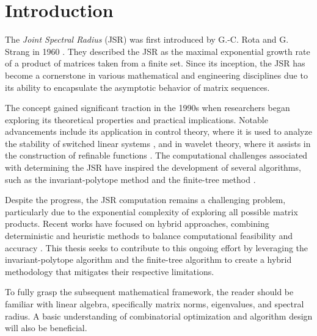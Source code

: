 
\chapter{Introduction}
\label{ch:introduction} %

The \textit{Joint Spectral Radius} (JSR) was first introduced by G.-C. Rota and G. Strang in 1960 \citep{rota1960note}. They described the JSR as the maximal exponential growth rate of a product of matrices taken from a finite set. Since its inception, the JSR has become a cornerstone in various mathematical and engineering disciplines due to its ability to encapsulate the asymptotic behavior of matrix sequences. 

The concept gained significant traction in the 1990s when researchers began exploring its theoretical properties and practical implications. Notable advancements include its application in control theory, where it is used to analyze the stability of switched linear systems \citep{blondel2000survey}, and in wavelet theory, where it assists in the construction of refinable functions \citep{daubechies1992ten}. The computational challenges associated with determining the JSR have inspired the development of several algorithms, such as the invariant-polytope method \citep{protasov2013invariant} and the finite-tree method \citep{jungers2009joint}.

Despite the progress, the JSR computation remains a challenging problem, particularly due to the exponential complexity of exploring all possible matrix products. Recent works have focused on hybrid approaches, combining deterministic and heuristic methods to balance computational feasibility and accuracy \citep{king2022hybrid}. This thesis seeks to contribute to this ongoing effort by leveraging the invariant-polytope algorithm and the finite-tree algorithm to create a hybrid methodology that mitigates their respective limitations.

To fully grasp the subsequent mathematical framework, the reader should be familiar with linear algebra, specifically matrix norms, eigenvalues, and spectral radius. A basic understanding of combinatorial optimization and algorithm design will also be beneficial.

